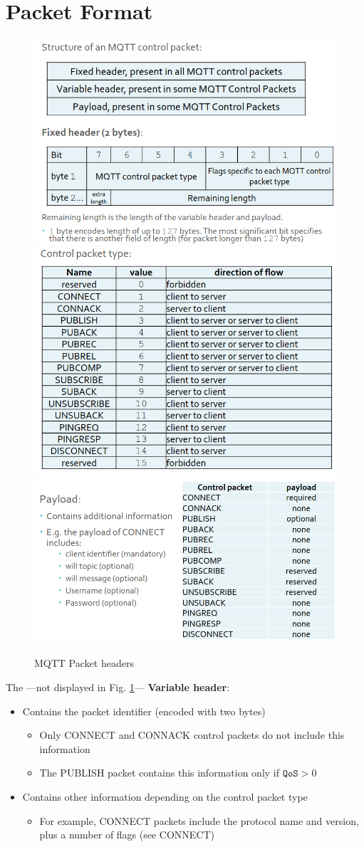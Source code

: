 \section{Packet Format}
\begin{figure}[htbp]
   \centering
   \includegraphics[width=0.45\columnwidth]{images/mqtt_packetformat1.png}
   \includegraphics[width=0.45\columnwidth]{images/mqtt_packetformat2.png}\\
   \includegraphics[width=0.45\columnwidth]{images/mqtt_packetformat3.png}
   \caption{MQTT Packet headers}
   \label{fig:mqtt_packetformat}
\end{figure}

The ---not displayed in Fig. \ref{fig:mqtt_packetformat}--- \textbf{Variable header}:
\begin{itemize}
   \item Contains the packet identifier (encoded with two
   bytes)
   \begin{itemize}
      \item Only CONNECT and CONNACK control packets do not
      include this information
      \item The PUBLISH packet contains this information only if $\texttt{QoS}>0$
   \end{itemize}
   \item Contains other information depending on the control
   packet type
   \begin{itemize}
      \item For example, CONNECT packets include the protocol name and version, plus a number of flags (see CONNECT)
   \end{itemize}
\end{itemize}

